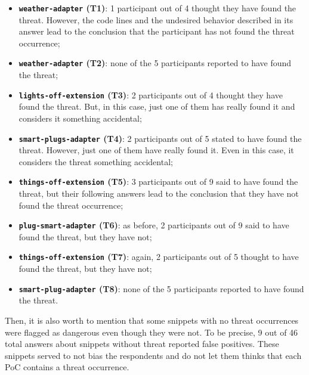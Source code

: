 \begin{itemize}
    \item \textbf{\texttt{weather-adapter} (T1)}: 1 participant out of 4 thought they have found the threat. However, the code lines and the undesired behavior described in its answer lead to the conclusion that the participant has not found the threat occurrence;

    \item \textbf{\texttt{weather-adapter} (T2)}: none of the 5 participants reported to have found the threat;

    \item \textbf{{\texttt{lights-off-extension} (T3)}}: 2 participants out of 4 thought they have found the threat. But, in this case, just one of them has really found it and considers it something accidental;

    \item \textbf{\texttt{smart-plugs-adapter} (T4)}: 2 participants out of 5 stated to have found the threat. However, just one of them have really found it. Even in this case, it considers the threat something accidental;

    \item \textbf{\texttt{things-off-extension} (T5)}: 3 participants out of 9 said to have found the threat, but their following answers lead to the conclusion that they have not found the threat occurrence;
    
    \item \textbf{\texttt{plug-smart-adapter} (T6)}: as before, 2 participants out of 9 said to have found the threat, but they have not;

    \item \textbf{\texttt{things-off-extension} (T7)}: again, 2 participants out of 5 thought to have found the threat, but they have not;

    \item \textbf{\texttt{smart-plug-adapter} (T8)}: none of the 5 participants reported to have found the threat.

\end{itemize}
Then, it is also worth to mention that some snippets with no threat occurrences were flagged as dangerous even though they were not. To be precise, 9 out of 46
total answers about snippets without threat reported false positives. These snippets served to not bias the respondents and do not let them thinks that each PoC contains a threat occurrence.

